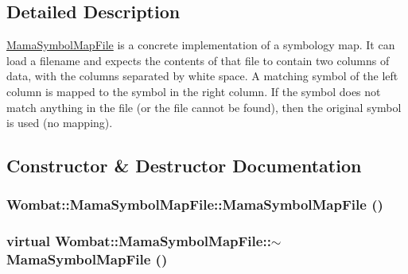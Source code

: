 \subsection{Detailed Description}
\hyperlink{classWombat_1_1MamaSymbolMapFile}{MamaSymbolMapFile} is a concrete implementation of a symbology map. It can load a filename and expects the contents of that file to contain two columns of data, with the columns separated by white space. A matching symbol of the left column is mapped to the symbol in the right column. If the symbol does not match anything in the file (or the file cannot be found), then the original symbol is used (no mapping). 

\subsection{Constructor \& Destructor Documentation}
\hypertarget{classWombat_1_1MamaSymbolMapFile_ae60584e1e114cb7ec1198dcc88e8852a}{
\subsubsection[{MamaSymbolMapFile}]{\setlength{\rightskip}{0pt plus 5cm}Wombat::MamaSymbolMapFile::MamaSymbolMapFile ()}}
\label{classWombat_1_1MamaSymbolMapFile_ae60584e1e114cb7ec1198dcc88e8852a}
\hypertarget{classWombat_1_1MamaSymbolMapFile_aa7382158180b5239cc57450a8f88385c}{
\subsubsection[{$\sim$MamaSymbolMapFile}]{\setlength{\rightskip}{0pt plus 5cm}virtual Wombat::MamaSymbolMapFile::$\sim$MamaSymbolMapFile ()}}
\label{classWombat_1_1MamaSymbolMapFile_aa7382158180b5239cc57450a8f88385c}


